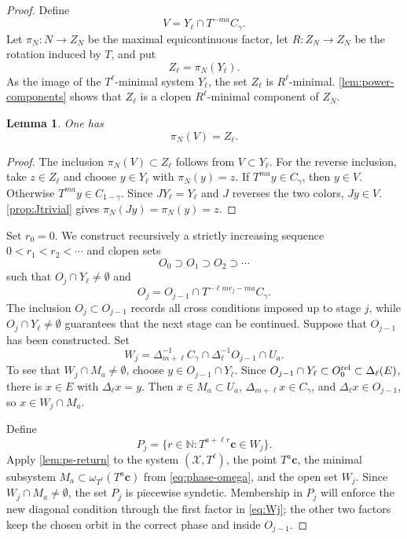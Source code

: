 \documentclass[reqno,12pt]{amsart}
\newtheorem{lemma}[thm]{Lemma}
\def \N {\mathbb N}
\numberwithin{equation}{section}
\begin{document}
\begin{proof}
Define
\begin{equation}\label{eq:V}
 V=Y_\ell\cap T^{-ma}C_\gamma.
\end{equation}
Let $\pi_N:N\to Z_N$ be the maximal equicontinuous factor, let
$R:Z_N\to Z_N$ be the rotation induced by $T$, and put
\[
 Z_\ell=\pi_N(Y_\ell).
\]
As the image of the $T^\ell$-minimal system $Y_\ell$, the set
$Z_\ell$ is $R^\ell$-minimal. \cref{lem:power-components} shows that $Z_\ell$ is a clopen
$R^\ell$-minimal component of $Z_N$.

\begin{lemma}\label{lem:Vfull}
One has
\[
 \pi_N(V)=Z_\ell.
\]
\end{lemma}

\begin{proof}
The inclusion $\pi_N(V)\subset Z_\ell$ follows from $V\subset Y_\ell$.
For the reverse inclusion, take $z\in Z_\ell$ and choose $y\in Y_\ell$
with $\pi_N(y)=z$. If
$T^{ma}y\in C_\gamma$, then $y\in V$. Otherwise
$T^{ma}y\in C_{1-\gamma}$. Since $JY_\ell=Y_\ell$ and $J$ reverses the two
colors, $Jy\in V$. \cref{prop:Jtrivial} gives
$\pi_N(Jy)=\pi_N(y)=z$.
\end{proof}

Set $r_0=0$. We construct recursively a strictly increasing sequence
$0<r_1<r_2<\cdots$ and clopen sets
\[
 O_0\supset O_1\supset O_2\supset\cdots
\]
such that $O_j\cap Y_\ell\neq\emptyset$ and
\begin{equation}\label{eq:Oj}
 O_j=O_{j-1}\cap T^{-\ell mr_j-ma}C_\gamma.
\end{equation}
The inclusion $O_j\subset O_{j-1}$ records all cross conditions imposed
up to stage $j$, while $O_j\cap Y_\ell\neq\emptyset$ guarantees that
the next stage can be continued.
Suppose that $O_{j-1}$ has been constructed. Set
\begin{equation}\label{eq:Wj}
 W_j=\Delta_{m+\ell}^{-1}C_\gamma
 \cap\Delta_\ell^{-1}O_{j-1}
 \cap U_a.
\end{equation}
To see that $W_j\cap M_a\neq\emptyset$, choose
$y\in O_{j-1}\cap Y_\ell$. Since
$O_{j-1}\cap Y_\ell\subset O_0^{\rm rel}\subset\Delta_\ell(E)$,
there is $x\in E$ with $\Delta_\ell x=y$. Then
$x\in M_a\subset U_a$, $\Delta_{m+\ell}x\in C_\gamma$, and
$\Delta_\ell x\in O_{j-1}$, so $x\in W_j\cap M_a$.

Define
\begin{equation}\label{eq:Pj}
 P_j=\{r\in\N:T^{a+\ell r}\mathbf c\in W_j\}.
\end{equation}
Apply \cref{lem:ps-return} to the system
$(\mathcal X,T^\ell)$, the point $T^a\mathbf c$, the minimal subsystem
$M_a\subset\omega_{T^\ell}(T^a\mathbf c)$ from
\eqref{eq:phase-omega}, and the open set $W_j$. Since
$W_j\cap M_a\neq\emptyset$, the set $P_j$ is piecewise syndetic.
Membership in $P_j$ will enforce the new diagonal condition through the
first factor in \eqref{eq:Wj}; the other two factors keep the chosen
orbit in the correct phase and inside $O_{j-1}$.


\end{proof}
\end{document}
